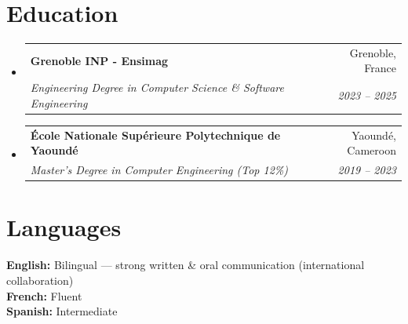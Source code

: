 \documentclass[letterpaper,11pt]{article}
\makeatletter
\newcommand{\resumeSubheading}[4]{
  \vspace{-2pt}\item
    \begin{tabular*}{0.97\textwidth}[t]{l@{\extracolsep{\fill}}r}
      \textbf{#1} & #2 \\
      \textit{\small#3} & \textit{\small #4} \\
    \end{tabular*}\vspace{-7pt}
}
\newcommand{\resumeSubHeadingListStart}{\begin{itemize}[leftmargin=0.15in, label={}]}
\newcommand{\resumeSubHeadingListEnd}{\end{itemize}}
\makeatother
\begin{document}
\section{Education}

\resumeSubHeadingListStart
  \resumeSubheading
    {Grenoble INP - Ensimag}{Grenoble, France}
    {Engineering Degree in Computer Science \& Software Engineering}{2023 -- 2025}
  \resumeSubheading
    {\'Ecole Nationale Sup\'erieure Polytechnique de Yaound\'e}{Yaound\'e, Cameroon}
    {Master's Degree in Computer Engineering (Top 12\%)}{2019 -- 2023}
\resumeSubHeadingListEnd

\section{Languages}

\small{
\textbf{English:} Bilingual --- strong written \& oral communication (international collaboration) \\
\textbf{French:} Fluent \\
\textbf{Spanish:} Intermediate
}
\end{document}
